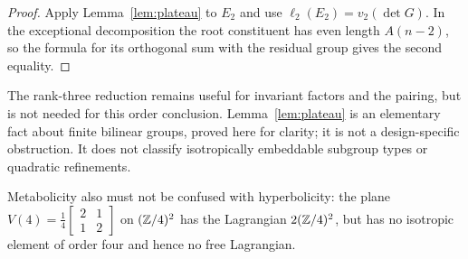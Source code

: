 \begin{proof}
Apply Lemma~\ref{lem:plateau} to $E_2$ and use
$\ell_2(E_2)=v_2(\det G)$. In the exceptional decomposition the root
constituent has even length $A(n-2)$, so the formula for its orthogonal sum
with the residual group gives the second equality.
\end{proof}

The rank-three reduction remains useful for invariant factors and the pairing,
but is not needed for this order conclusion. Lemma~\ref{lem:plateau} is an
elementary fact about finite bilinear groups, proved here for clarity; it is
not a design-specific obstruction. It does not classify isotropically
embeddable subgroup types or quadratic refinements.

Metabolicity also must
not be confused with hyperbolicity: the plane
$V(4)=\frac14\left[\begin{smallmatrix}2&1\\1&2\end{smallmatrix}\right]$
on $(\mathbb{Z}/4)^2$ has the Lagrangian $2(\mathbb{Z}/4)^2$, but has no isotropic element
of order four and hence no free Lagrangian.
